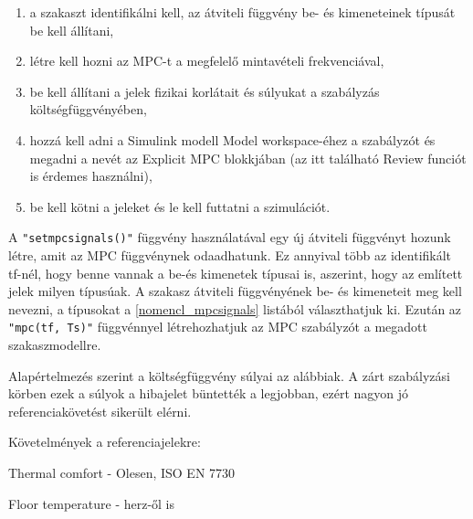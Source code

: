 \begin{enumerate}[noitemsep,topsep=0pt,parsep=2pt,partopsep=4pt,leftmargin=30pt]
	\item a szakaszt identifikálni kell, az átviteli függvény be- és kimeneteinek típusát be kell állítani,
	\item létre kell hozni az MPC-t a megfelelő mintavételi frekvenciával,
	\item be kell állítani a jelek fizikai korlátait és súlyukat a szabályzás költségfüggvényében,
	\item hozzá kell adni a Simulink modell Model workspace-éhez a szabályzót és megadni a nevét az Explicit MPC blokkjában (az itt található Review funciót is érdemes használni),
	\item be kell kötni a jeleket és le kell futtatni a szimulációt.
	
\end{enumerate}


A \verb|"setmpcsignals()"| függvény használatával egy új átviteli függvényt hozunk létre, amit az MPC függvénynek odaadhatunk. Ez annyival több az identifikált tf-nél, hogy benne vannak a be-és kimenetek típusai is, aszerint, hogy az említett jelek milyen típusúak. A szakasz átviteli függvényének be- és kimeneteit meg kell nevezni, a típusokat a \ref{nomencl_mpcsignals} listából választhatjuk ki. Ezután az \verb|"mpc(tf, Ts)"| függvénnyel létrehozhatjuk az MPC szabályzót a megadott szakaszmodellre.

Alapértelmezés szerint a költségfüggvény súlyai az alábbiak. A zárt szabályzási körben ezek a súlyok a hibajelet büntették a legjobban, ezért nagyon jó referenciakövetést sikerült elérni.


Követelmények a referenciajelekre:

Thermal comfort - Olesen, ISO EN 7730

Floor temperature - herz-ől is







